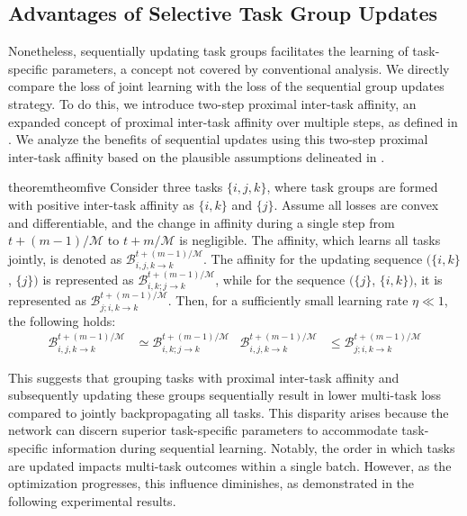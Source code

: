 \subsection{Advantages of Selective Task Group Updates}
Nonetheless, sequentially updating task groups facilitates the learning of task-specific parameters, a concept not covered by conventional analysis. We directly compare the loss of joint learning with the loss of the sequential group updates strategy. To do this, we introduce two-step proximal inter-task affinity, an expanded concept of proximal inter-task affinity over multiple steps, as defined in . We analyze the benefits of sequential updates using this two-step proximal inter-task affinity based on the plausible assumptions delineated in .
\begin{restatable}[]{theorem}{theomfive}
\label{theorem5}
Consider three tasks $\{i, j, k\}$, where task groups are formed with positive inter-task affinity as $\{i, k\}$ and $\{j\}$. Assume all losses are convex and differentiable, and the change in affinity during a single step from $t+(m-1)/\mathcal{M}$ to $t+m/\mathcal{M}$ is negligible. The affinity, which learns all tasks jointly, is denoted as $\mathcal{B}_{i,j,k \rightarrow k}^{t+(m-1)/\mathcal{M}}$. The affinity for the updating sequence $(\{i, k\}$, $\{j\})$ is represented as $\mathcal{B}_{i,k; j \rightarrow k}^{t+(m-1)/\mathcal{M}}$, while for the sequence $(\{j\}$, $\{i, k\})$, it is represented as $\mathcal{B}_{j; i,k \rightarrow k}^{t+(m-1)/\mathcal{M}}$. Then, for a sufficiently small learning rate $\eta \ll 1$, the following holds:
\begin{align}
    \mathcal{B}_{i,j,k \rightarrow k}^{t+(m-1)/\mathcal{M}} &\simeq \mathcal{B}_{i,k; j \rightarrow k}^{t+(m-1)/\mathcal{M}} & \mathcal{B}_{i,j,k \rightarrow k}^{t+(m-1)/\mathcal{M}} &\leq \mathcal{B}_{j; i,k \rightarrow k}^{t+(m-1)/\mathcal{M}}
\end{align}
\end{restatable}

This suggests that grouping tasks with proximal inter-task affinity and subsequently updating these groups sequentially result in lower multi-task loss compared to jointly backpropagating all tasks. This disparity arises because the network can discern superior task-specific parameters to accommodate task-specific information during sequential learning. Notably, the order in which tasks are updated impacts multi-task outcomes within a single batch. However, as the optimization progresses, this influence diminishes, as demonstrated in the following experimental results.